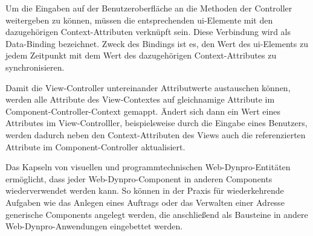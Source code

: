 \newpage
Um die Eingaben auf der Benutzeroberfläche an die Methoden der Controller weitergeben zu können, müssen die entsprechenden \ac{ui}-Elemente mit den dazugehörigen Context-Attributen verknüpft sein. Diese Verbindung wird als Data-Binding bezeichnet. Zweck des Bindings ist es, den Wert des \ac{ui}-Elements zu jedem Zeitpunkt mit dem Wert des dazugehörigen Context-Attributes zu synchronisieren.\autocite[Vgl.][S.752]{KELLER2015}

Damit die View-Controller untereinander Attributwerte austauschen können, werden alle Attribute des View-Contextes auf gleichnamige Attribute im Component-Controller-Context gemappt. Ändert sich dann ein Wert eines Attributes im View-Controlller, beispielsweise durch die Eingabe eines Benutzers, werden dadurch neben den Context-Attributen des Views auch die referenzierten Attribute im Component-Controller aktualisiert.\autocite[Vgl.][S.8]{NET310}



Das Kapseln von visuellen und programmtechnischen Web-Dynpro-Entitäten ermöglicht, dass jeder Web-Dynpro-Component in anderen Components wiederverwendet werden kann.\autocite[Vgl.][S.5]{NET310} 
So können in der Praxis für wiederkehrende Aufgaben wie das Anlegen eines Auftrags oder das Verwalten einer Adresse generische Components angelegt werden, die anschließend als Bausteine in andere Web-Dynpro-Anwendungen eingebettet werden. 

